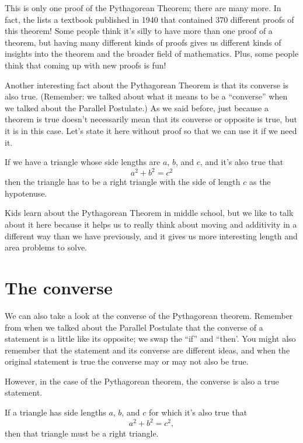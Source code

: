 \documentclass{ximera}
\begin{document}
This is only one proof of the Pythagorean Theorem; there are many more. In fact, the  lists a textbook published in 1940 that contained 370 different proofs of this theorem! Some people think it's silly to have more than one proof of a theorem, but having many different kinds of proofs gives us different kinds of insights into the theorem and the broader field of mathematics. Plus, some people think that coming up with new proofs is fun!

Another interesting fact about the Pythagorean Theorem is that its converse is also true. (Remember: we talked about what it means to be a ``converse'' when we talked about the Parallel Postulate.) As we said before, just because a theorem is true doesn't necessarily mean that its converse or opposite is true, but it is in this case. Let's state it here without proof so that we can use it if we need it.

\begin{theorem}
 If we have a triangle whose side lengths are $a$, $b$, and $c$, and it's also true that
\[
a^2 + b^2 = c^2
\]
then the triangle has to be a right triangle with the side of length $c$ as the hypotenuse.
\end{theorem}



Kids learn about the Pythagorean Theorem in middle school, but we like to talk about it here because it helps us to really think about moving and additivity in a different way than we have previously, and it gives us more interesting length and area problems to solve.

\section{The converse}

We can also take a look at the converse of the Pythagorean theorem. Remember from when we talked about the Parallel Postulate that the converse of a statement is a little like its opposite; we swap the ``if'' and ``then'. You might also remember that the statement and its converse are different ideas, and when the original statement is true the converse may or may not also be true.

However, in the case of the Pythagorean theorem, the converse is also a true statement.
\begin{theorem}
If a triangle has side lengths $a$, $b$, and $c$ for which it's also true that
\[
a^2 + b^2 = c^2,
\]
then that triangle must be a right triangle.
\end{theorem}
\end{document}
